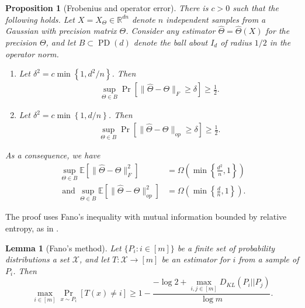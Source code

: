 \documentclass[aos]{imsart}
\newtheorem{prop}[theorem]{Proposition}
\newtheorem{lemma}[theorem]{Lemma}
\theoremstyle{definition}
\numberwithin{equation}{section}
\DeclareMathOperator{\PD}{PD}
\newcommand{\R}{{\mathbb{R}}}
\newcommand{\htheta}{\widehat{\Theta}}
\newcommand{\E}{\mathbb{E}}
\begin{document}
\begin{prop}[Frobenius and operator error]\label{prp:standard-lower}
There is $c > 0$ such that the following holds. Let $X = X_{\Theta} \in \R^{dn}$ denote $n$ independent samples from a Gaussian with precision matrix $\Theta$. Consider any estimator $\htheta = \htheta(X)$ for the precision $\Theta$, and let $B\subset \PD(d)$ denote the ball about $I_d$ of radius $1/2$ in the operator norm.
\begin{enumerate}
\item Let $\delta^2 = c\min \left\{1,d^2/n\right\}$. Then
\begin{align}
\sup_{\Theta \in B} \Pr\left[ \| \htheta - \Theta\|_F \geq \delta\right] \geq \frac{1}{2}.\label{eq:frob-lower}
\end{align}
\item Let $\delta^2 = c\min \left\{1,d/n\right\}$. Then
 \begin{align}
\sup_{\Theta \in B} \Pr\left[ \| \htheta - \Theta\|_{op} \geq \delta\right] \geq \frac{1}{2}. \label{eq:op-lower}
\end{align}
\end{enumerate}
As a consequence, we have 
\begin{align*}\sup_{\Theta \in B}\E[\| \htheta - \Theta\|_F^2] &=\Omega\left( \min \left\{\frac{d^2}{n},1\right\}\right)\\
\text{ and } \sup_{\Theta \in B}\E[\| \htheta - \Theta\|_{op}^2] &= \Omega\left( \min \left\{\frac{d}{n},1\right\}\right).\end{align*}
\end{prop}
The proof uses Fano's inequality with mutual information bounded by relative entropy, as in \cite{yang1999information}.
\begin{lemma}[Fano's method]
Let $\{P_i: i \in [m]\}$ be a finite set of probability distributions a set $\mathcal X$, and let $T: \mathcal X \to [m]$ be an estimator for $i$ from a sample of $P_i$. Then 
$$ \max_{i\in [m]} \Pr_{x \sim P_i}[T(x) \neq i] \geq 1 - \frac{ - \log 2 + \max_{i,j \in [m]} D_{KL}(P_i|| P_j)}{\log m}.$$
\end{lemma}
\end{document}
